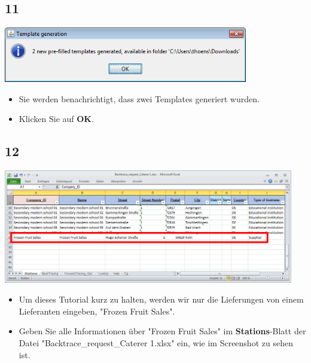 \documentclass{beamer}
\begin{document}
\subsection{11}
\begin{frame}
	\begin{center}
  		\includegraphics[width=0.8\textwidth]{11.png}
	\end{center}
	\begin{itemize}
		\item Sie werden benachrichtigt, dass zwei Templates generiert wurden.
		\item Klicken Sie auf \textbf{OK}.
	\end{itemize}
\end{frame}

\subsection{12}
\begin{frame}
	\begin{center}
  		\includegraphics[width=0.95\textwidth]{12.png}
	\end{center}
	\begin{itemize}
		\item Um dieses Tutorial kurz zu halten, werden wir nur die Lieferungen von einem Lieferanten eingeben, "Frozen Fruit Sales".
		\item Geben Sie alle Informationen über "Frozen Fruit Sales" im \textbf{Stations}-Blatt der Datei "Backtrace\_request\_Caterer 1.xlsx" ein, wie im Screenshot zu sehen ist.
	\end{itemize}
\end{frame}
\end{document}
